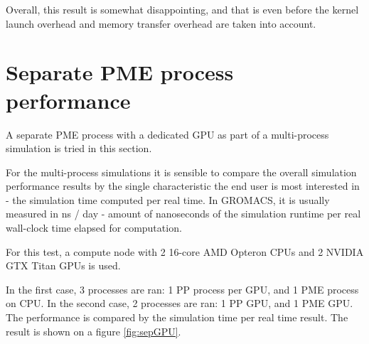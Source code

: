 \documentclass[12pt,a4paper]{report}
\newcommand{\draft}[1]{#1}
\begin{document}
\fi

Overall, this result is somewhat disappointing, and that is even before the kernel launch overhead and memory transfer overhead are taken into account.
 

\section{Separate PME process performance}

A separate PME process with a dedicated GPU as part of a multi-process simulation is tried in this section.

For the multi-process simulations it is sensible to compare the overall simulation performance results by the single characteristic the end user is most interested in - the simulation time computed per real time. In GROMACS, it is usually measured in ns / day - amount of nanoseconds of the simulation runtime per real wall-clock time elapsed for computation.

For this test, a compute node with 2 16-core AMD Opteron CPUs and 2 NVIDIA GTX Titan GPUs is used.

In the first case, 3 processes are ran: 1 PP process per GPU, and 1 PME process on CPU. In the second case, 2 processes are ran: 1 PP GPU, and 1 PME GPU. The performance is compared by the simulation time per real time result. The result is shown on a figure \ref{fig:sepGPU}.
\end{document}

